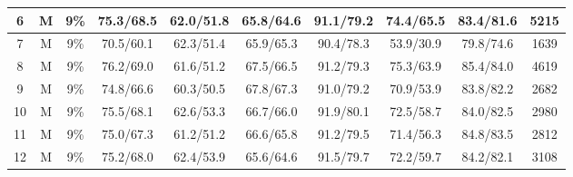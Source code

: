 \begin{table*}
{\begin{tabular}{|c|c|c||c|c|c|c|c|c||c|}
6 & M & 9\% & 75.3/68.5 & 62.0/51.8 & 65.8/64.6 & 91.1/79.2 & 74.4/65.5 & 83.4/81.6 & 5215 \\ \hline
7 & M & 9\% & 70.5/60.1 & 62.3/51.4 & 65.9/65.3 & 90.4/78.3 & 53.9/30.9 & 79.8/74.6 & 1639 \\ \hline
8 & M & 9\% & 76.2/69.0 & 61.6/51.2 & 67.5/66.5 & 91.2/79.3 & 75.3/63.9 & 85.4/84.0 & 4619 \\ \hline
9 & M & 9\% & 74.8/66.6 & 60.3/50.5 & 67.8/67.3 & 91.0/79.2 & 70.9/53.9 & 83.8/82.2 & 2682 \\ \hline
10 & M & 9\% & 75.5/68.1 & 62.6/53.3 & 66.7/66.0 & 91.9/80.1 & 72.5/58.7 & 84.0/82.5 & 2980 \\ \hline
11 & M & 9\% & 75.0/67.3 & 61.2/51.2 & 66.6/65.8 & 91.2/79.5 & 71.4/56.3 & 84.8/83.5 & 2812 \\ \hline
12 & M & 9\% & 75.2/68.0 & 62.4/53.9 & 65.6/64.6 & 91.5/79.7 & 72.2/59.7 & 84.2/82.1 & 3108 \\ \hline
\end{tabular}}
\end{table*}


